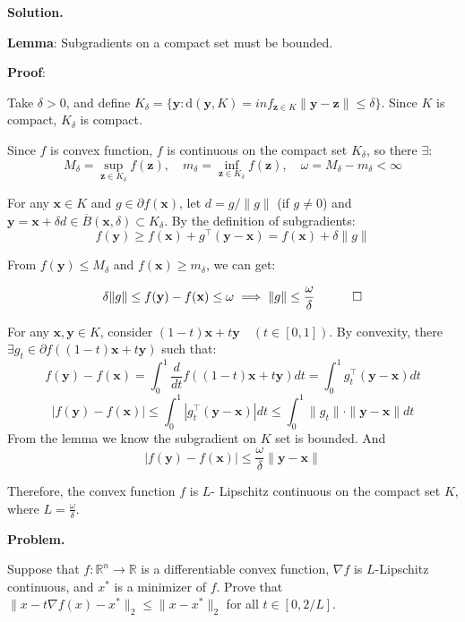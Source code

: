 \documentclass[12pt, a4paper, oneside]{ctexart}
\newcounter{problemname}
\newenvironment{problem}{\begin{shaded}\stepcounter{problemname}\par\noindent\textbf{Problem\arabic{problemname}. }}{\end{shaded}\par}
\newenvironment{solution}{\par\noindent\textbf{Solution. }}{\par}
\begin{document}
\begin{solution}
	
\textbf{Lemma}: Subgradients on a compact set must be bounded.

\textbf{Proof}:

Take $ \delta > 0 $, and define $ K_\delta = \{ \mathbf{y} : \text{d}(\mathbf{y}, K) =inf_{\mathbf{z}\in K}\|\mathbf{y}-\mathbf{z}\| \leq \delta \} $.  Since $ K $ is compact, $ K_\delta $ is compact.

Since $ f $ is convex function, $ f $ is continuous on the compact set $ K_\delta $, so there $\exists$:  
$$
M_\delta = \sup_{\mathbf{z} \in K_\delta} f(\mathbf{z}), \quad m_\delta = \inf_{\mathbf{z} \in K_\delta} f(\mathbf{z}), \quad \omega = M_\delta - m_\delta < \infty
$$  

For any $ \mathbf{x} \in K $ and $ g \in \partial f(\mathbf{x}) $, let $ d = g / \|g\| $ (if $ g \neq 0 $) and $ \mathbf{y} = \mathbf{x} + \delta d \in \overline{B}(\mathbf{x}, \delta) \subset K_\delta $. By the definition of subgradients:  
$$
f(\mathbf{y}) \geq f(\mathbf{x}) + g^\top (\mathbf{y} - \mathbf{x}) = f(\mathbf{x}) + \delta \|g\|
$$  

From $ f(\mathbf{y}) \leq M_\delta $ and $ f(\mathbf{x}) \geq m_\delta $, we can get:  

$$\delta \|g\| \leq f(\mathbf{y}) - f(\mathbf{x}) \leq \omega \implies \|g\| \leq \frac{\omega}{\delta} \quad \qed
$$  

\vspace{12pt}

For any $ \mathbf{x}, \mathbf{y} \in K $, consider $(1 - t)\mathbf{x} + t\mathbf{y}  \quad (t \in [0, 1]) $. By convexity,  there $\exists  g_t \in \partial f((1 - t)\mathbf{x} + t\mathbf{y}) $ such that:
$$f(\mathbf{y}) - f(\mathbf{x}) = \int_{0}^{1} \frac{d}{dt}f((1 - t)\mathbf{x} + t\mathbf{y}) dt = \int_{0}^{1} g_t^\top (\mathbf{y} - \mathbf{x}) dt
$$
$$
|f(\mathbf{y}) - f(\mathbf{x})| \leq \int_{0}^{1} |g_t^\top (\mathbf{y} - \mathbf{x})| dt \leq \int_{0}^{1} \|g_t\| \cdot \|\mathbf{y} - \mathbf{x}\| dt
$$
From the lemma we know the subgradient on $ K $ set is bounded. And
$$
|f(\mathbf{y}) - f(\mathbf{x})| \leq \frac{\omega}{\delta} \|\mathbf{y} - \mathbf{x}\|
$$

Therefore, the convex function $ f $ is $L$- Lipschitz continuous on the compact set $ K $, where $L=\frac{\omega}{\delta}$.
	
\end{solution}


\begin{problem}
	
\noindent Suppose that $ f:\mathbb{R}^n \to \mathbb{R} $ is a differentiable convex function, $ \nabla f $ is $ L $-Lipschitz continuous, and $ x^* $ is a minimizer of $ f $. Prove that $ \|x - t\nabla f(x) - x^*\|_2 \leq \|x - x^*\|_2 $ for all $ t \in [0, 2/L] $.

\end{problem}
\end{document}

